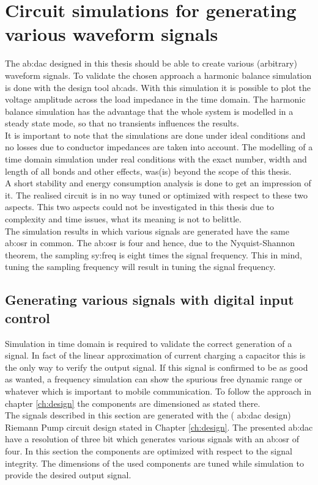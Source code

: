 \chapter{Circuit simulations for generating various waveform signals}

The \gls{ab:dac} designed in this thesis should be able to create various (arbitrary) waveform signals.
 To validate the chosen approach a harmonic balance simulation is done with the design tool \gls{ab:ads}.
  With this simulation it is possible to plot the voltage amplitude across the load impedance in the time domain.
   The harmonic balance simulation has the advantage that the whole system is modelled in a steady state mode, so that no transients influences the results.\\
    It is important to note that the simulations are done under ideal conditions and no losses due to conductor impedances are taken into account.
    The modelling of a time domain simulation under real conditions with the exact number, width and length of all bonds and other effects, was(is) beyond the scope of this thesis.\\
    A short stability and energy consumption analysis is done to get an impression of it. 
    The realised circuit is in no way tuned or optimized with respect to these two aspects.
     This two aspects could not be investigated in this thesis due to complexity and time issues, what its meaning is not to belittle.\\
    
The simulation results in which various signals are generated have the same \gls{ab:osr} in common.
The \gls{ab:osr} is four and hence, due to the Nyquist-Shannon theorem, the sampling \gls{sy:freq} is eight times the signal frequency.
This in mind, tuning the sampling frequency will result in tuning the signal frequency. 

\section{Generating various signals with digital input control}
Simulation in time domain is required to validate the correct generation of a signal. In fact of the linear approximation of current charging a capacitor this is the only way to verify the output signal. If this signal is confirmed to be as good as wanted, a frequency simulation can show the spurious free dynamic range or whatever which is important to mobile communication. To follow the approach in chapter \ref{ch:design} the components are dimensioned as stated there.\\
 The signals described in this section are generated with the ( \gls{ab:dac} design) Riemann Pump circuit design stated in Chapter \ref{ch:design}. The presented \gls{ab:dac} have a resolution of three bit which generates various signals with an \gls{ab:osr} of four. 
 In this section the components are optimized with respect to the signal integrity. The dimensions of the used components are tuned while simulation to provide the desired output signal.
 
